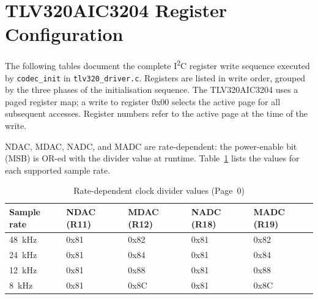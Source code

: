 \newpage
\section{TLV320AIC3204 Register Configuration}
\label{app:codec-regs}

The following tables document the complete I\textsuperscript{2}C register write sequence executed by \texttt{codec\_init} in \texttt{tlv320\_driver.c}.
Registers are listed in write order, grouped by the three phases of the initialisation sequence.
The TLV320AIC3204 uses a paged register map; a write to register 0x00 selects the active page for all subsequent accesses.
Register numbers refer to the active page at the time of the write.

NDAC, MDAC, NADC, and MADC are rate-dependent: the power-enable bit (MSB) is OR-ed with the divider value at runtime.
Table~\ref{tab:codec-rate-dividers} lists the values for each supported sample rate.

\begin{table}[H]
    \centering
    \caption{Rate-dependent clock divider values (Page~0)}
    \label{tab:codec-rate-dividers}
    \small
    \begin{tabular}{lllll}
        \toprule
        \textbf{Sample rate} & \textbf{NDAC (R11)} & \textbf{MDAC (R12)} & \textbf{NADC (R18)} & \textbf{MADC (R19)} \\
        \midrule
        \SI{48}{\kilo\hertz} & 0x81 & 0x82 & 0x81 & 0x82 \\
        \SI{24}{\kilo\hertz} & 0x81 & 0x84 & 0x81 & 0x84 \\
        \SI{12}{\kilo\hertz} & 0x81 & 0x88 & 0x81 & 0x88 \\
        \SI{8}{\kilo\hertz}  & 0x81 & 0x8C & 0x81 & 0x8C \\
        \bottomrule
    \end{tabular}
\end{table}

